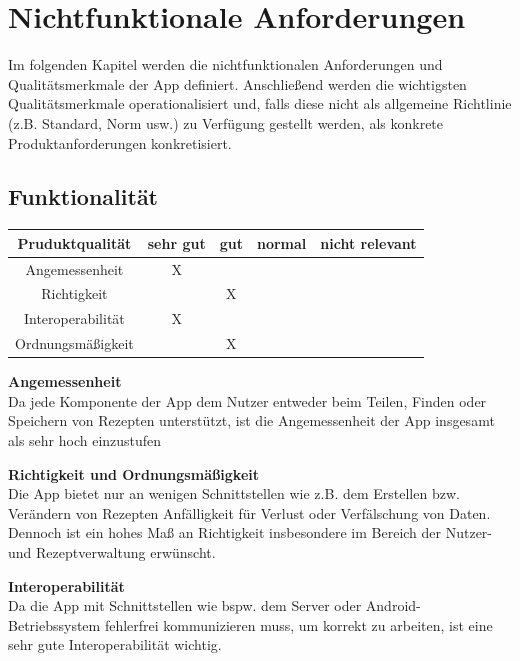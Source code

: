 \documentclass[parskip=full]{scrartcl}
\begin{document}
\section{Nichtfunktionale Anforderungen}
Im folgenden Kapitel werden die nichtfunktionalen Anforderungen und Qualitätsmerkmale der App definiert.
Anschließend werden die wichtigsten Qualitätsmerkmale operationalisiert und, falls diese nicht als allgemeine Richtlinie (z.B. Standard, Norm usw.) zu Verfügung gestellt werden,
als konkrete Produktanforderungen konkretisiert.

\subsection{Funktionalität}
\begin{tabular}{| c | c | c | c | c |}
    \hline
    \textbf{Pruduktqualität} & \textbf{sehr gut} & \textbf{gut} & \textbf{normal} & \textbf{nicht relevant} \\ \hline
    Angemessenheit           & X                  &              &                 &                         \\ \hline
    Richtigkeit              &                   & X             &                 &                         \\ \hline
    Interoperabilität        & X                  &              &                 &                         \\ \hline
    Ordnungsmäßigkeit        &                   & X             &                 &                         \\ \hline
\end{tabular}

\textbf{Angemessenheit}\\
Da jede Komponente der App dem Nutzer entweder beim Teilen, Finden oder Speichern von Rezepten unterstützt, ist die Angemessenheit der App insgesamt als sehr hoch einzustufen

\textbf{Richtigkeit und Ordnungsmäßigkeit}\\
Die App bietet nur an wenigen Schnittstellen wie z.B. dem Erstellen bzw. Verändern von Rezepten Anfälligkeit für Verlust oder Verfälschung von Daten. Dennoch ist ein hohes Maß an Richtigkeit insbesondere im Bereich der Nutzer- und Rezeptverwaltung erwünscht.

\textbf{Interoperabilität}\\
Da die App mit Schnittstellen wie bspw. dem Server oder Android-Betriebssystem fehlerfrei kommunizieren muss, um korrekt zu arbeiten, ist eine sehr gute Interoperabilität wichtig.
\end{document}
